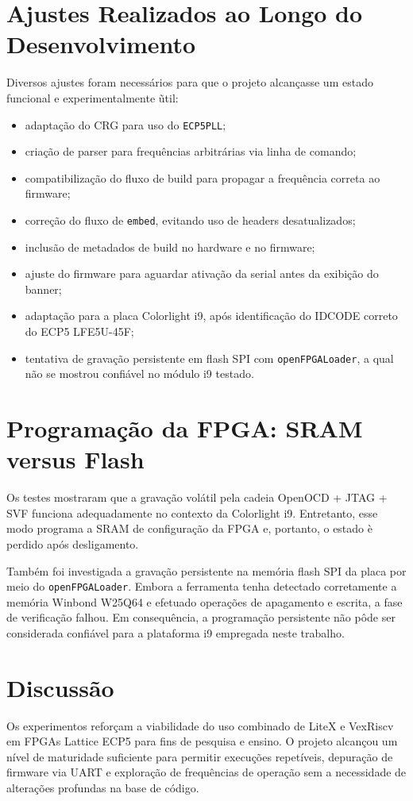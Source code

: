 \documentclass[10pt,twocolumn,a4paper]{article}
\begin{document}
\section{Ajustes Realizados ao Longo do Desenvolvimento}
Diversos ajustes foram necess\'arios para que o projeto alcan\c{c}asse um estado funcional e experimentalmente \~util:
\begin{itemize}[leftmargin=*]
    \item adapta\c{c}\~ao do CRG para uso do \texttt{ECP5PLL};
    \item cria\c{c}\~ao de parser para frequ\^encias arbitr\'arias via linha de comando;
    \item compatibiliza\c{c}\~ao do fluxo de build para propagar a frequ\^encia correta ao firmware;
    \item corre\c{c}\~ao do fluxo de \texttt{embed}, evitando uso de headers desatualizados;
    \item inclus\~ao de metadados de build no hardware e no firmware;
    \item ajuste do firmware para aguardar ativa\c{c}\~ao da serial antes da exibi\c{c}\~ao do banner;
    \item adapta\c{c}\~ao para a placa Colorlight i9, ap\'os identifica\c{c}\~ao do IDCODE correto do ECP5 LFE5U-45F;
    \item tentativa de grava\c{c}\~ao persistente em flash SPI com \texttt{openFPGALoader}, a qual n\~ao se mostrou confi\'avel no m\'odulo i9 testado.
\end{itemize}

\section{Programa\c{c}\~ao da FPGA: SRAM versus Flash}
Os testes mostraram que a grava\c{c}\~ao vol\'atil pela cadeia OpenOCD + JTAG + SVF funciona adequadamente no contexto da Colorlight i9. Entretanto, esse modo programa a SRAM de configura\c{c}\~ao da FPGA e, portanto, o estado \`e perdido ap\'os desligamento.

Tamb\'em foi investigada a grava\c{c}\~ao persistente na mem\'oria flash SPI da placa por meio do \texttt{openFPGALoader}. Embora a ferramenta tenha detectado corretamente a mem\'oria Winbond W25Q64 e efetuado opera\c{c}\~oes de apagamento e escrita, a fase de verifica\c{c}\~ao falhou. Em consequ\^encia, a programa\c{c}\~ao persistente n\~ao p\^ode ser considerada confi\'avel para a plataforma i9 empregada neste trabalho.

\section{Discuss\~ao}
Os experimentos refor\c{c}am a viabilidade do uso combinado de LiteX e VexRiscv em FPGAs Lattice ECP5 para fins de pesquisa e ensino. O projeto alcan\c{c}ou um n\'ivel de maturidade suficiente para permitir execu\c{c}\~oes repet\'iveis, depura\c{c}\~ao de firmware via UART e explora\c{c}\~ao de frequ\^encias de opera\c{c}\~ao sem a necessidade de altera\c{c}\~oes profundas na base de c\'odigo.
\end{document}
